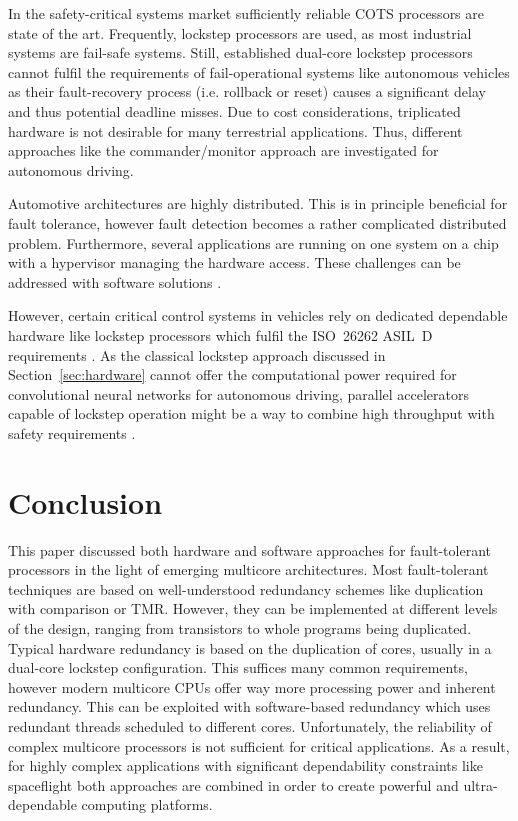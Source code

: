 \documentclass[conference]{IEEEtran}
\begin{document}
In the safety-critical systems market sufficiently reliable COTS processors are state of the art. Frequently, lockstep processors are used, as most industrial systems are fail-safe systems. Still, established dual-core lockstep processors cannot fulfil the requirements of fail-operational systems like autonomous vehicles as their fault-recovery process (i.e. rollback or reset) causes a significant delay and thus potential deadline misses. Due to cost considerations, triplicated hardware is not desirable for many terrestrial applications. Thus, different approaches like the commander/monitor approach \cite{Mehmed2020} are investigated for autonomous driving.

Automotive architectures are highly distributed. This is in principle beneficial for fault tolerance, however fault detection becomes a rather complicated distributed problem. Furthermore, several applications are running on one system on a chip with a hypervisor managing the hardware access. These challenges can be addressed with software solutions \cite{Bijlsma2020}.

However, certain critical control systems in vehicles rely on dedicated dependable hardware like lockstep processors which fulfil the ISO~26262 ASIL~D requirements \cite{Han2017}. As the classical lockstep approach discussed in Section~\ref{sec:hardware} cannot offer the computational power required for convolutional neural networks for autonomous driving, parallel accelerators capable of lockstep operation might be a way to combine high throughput with safety requirements \cite{Matsubara2021}.


\section{Conclusion}
\label{sec:conclusion}

This paper discussed both hardware and software approaches for fault-tolerant processors in the light of emerging multicore architectures. Most fault-tolerant techniques are based on well-understood redundancy schemes like duplication with comparison or TMR. However, they can be implemented at different levels of the design, ranging from transistors to whole programs being duplicated. Typical hardware redundancy is based on the duplication of cores, usually in a dual-core lockstep configuration. This suffices many common requirements, however modern multicore CPUs offer way more processing power and inherent redundancy. This can be exploited with software-based redundancy which uses redundant threads scheduled to different cores. Unfortunately, the reliability of complex multicore processors is not sufficient for critical applications. As a result, for highly complex applications with significant dependability constraints like spaceflight both approaches are combined in order to create powerful and ultra-dependable computing platforms.


\printbibliography
\end{document}
